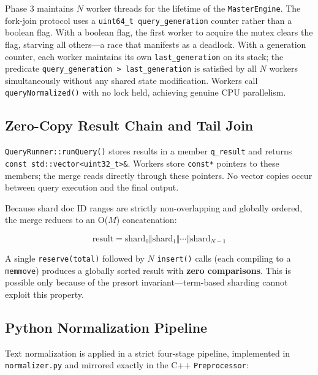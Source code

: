 \documentclass[twocolumn, 10pt]{article}
\begin{document}
Phase 3 maintains $N$ worker threads for the lifetime of the
\texttt{MasterEngine}. The fork-join protocol uses a
\texttt{uint64\_t query\_generation} counter rather than a boolean flag.
With a boolean flag, the first worker to acquire the mutex clears the flag,
starving all others---a race that manifests as a deadlock. With a generation
counter, each worker maintains its own \texttt{last\_generation} on its
stack; the predicate \texttt{query\_generation > last\_generation} is
satisfied by all $N$ workers simultaneously without any shared state
modification. Workers call \texttt{queryNormalized()} with no lock held,
achieving genuine CPU parallelism.

\subsection{Zero-Copy Result Chain and Tail Join}

\texttt{QueryRunner::runQuery()} stores results in a member
\texttt{q\_result} and returns \texttt{const std::vector<uint32\_t>\&}.
Workers store \texttt{const*} pointers to these members; the merge reads
directly through these pointers. No vector copies occur between query
execution and the final output.

Because shard doc ID ranges are strictly non-overlapping and globally
ordered, the merge reduces to an O($M$) concatenation:

\[
\text{result} = \text{shard}_0 \Vert \text{shard}_1 \Vert \cdots \Vert \text{shard}_{N-1}
\]

A single \texttt{reserve(total)} followed by $N$ \texttt{insert()} calls
(each compiling to a \texttt{memmove}) produces a globally sorted result
with \textbf{zero comparisons}. This is possible only because of the
presort invariant---term-based sharding cannot exploit this property.

\subsection{Python Normalization Pipeline}

Text normalization is applied in a strict four-stage pipeline, implemented
in \texttt{normalizer.py} and mirrored exactly in the C++
\texttt{Preprocessor}:
\end{document}
